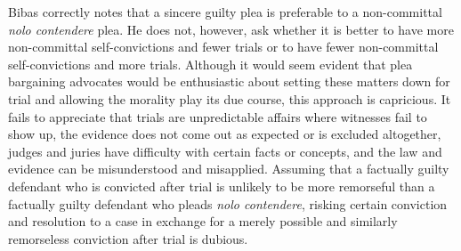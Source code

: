 Bibas correctly notes that a sincere guilty plea is preferable to a non-committal \textit{nolo contendere} plea. He does not, however, ask whether it is better to have more non-committal self-convictions and fewer trials or to have fewer non-committal self-convictions and more trials. Although it would seem evident that plea bargaining advocates would be enthusiastic about setting these matters down for trial and allowing the morality play its due course, this approach is capricious. It fails to appreciate that trials are unpredictable affairs where witnesses fail to show up, the evidence does not come out as expected or is excluded altogether, judges and juries have difficulty with certain facts or concepts, and the law and evidence can be misunderstood and misapplied. Assuming that a factually guilty defendant who is convicted after trial is unlikely to be more remorseful than a factually guilty defendant who pleads \textit{nolo contendere}, risking certain conviction and resolution to a case in exchange for a merely possible and similarly remorseless conviction after trial is dubious. 


